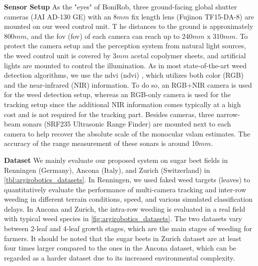 \noindent \textbf{Sensor Setup} 
As the "eyes" of BoniRob, three ground-facing global shutter cameras (JAI AD-130 GE) with an 8$mm$ fix length lens (Fujinon TF15-DA-8) are mounted on our weed control unit. T
he distances to the ground is approximately 800$mm$, and the \acrlong{fov} (\acrshort{fov}) of each camera can reach up to 240${mm}$ x 310${mm}$. 
To protect the camera setup and the perception system from natural light sources, the weed control unit is covered by 3$mm$ acetal copolymer sheets, and artificial lights are mounted to control the illumination. 
As in most state-of-the-art weed detection algorithms, we use the \acrlong{ndvi} (\acrshort{ndvi}) \cite{lottes2016effective}, which utilizes both color (RGB) and the near-infrared (NIR) information. 
To do so, an RGB+NIR camera is used for the weed detection setup, whereas an RGB-only camera is used for the tracking setup since the additional NIR information comes typically at a high cost and is not required for the tracking part. 
Besides cameras, three narrow-beam sonars (SRF235 Ultrasonic Range Finder) are mounted next to each camera to help recover the absolute scale of the monocular \acrshort{vslam} estimates. 
The accuracy of the range measurement of these sonars is around 10$mm$.

\noindent \textbf{Dataset} We mainly evaluate our proposed system on sugar beet fields in Renningen (Germany), Ancona (Italy), and Zurich (Switzerland) in \ref{tbl:argirobotics_datasets}. In Renningen, we used faked weed targets (leaves) to quantitatively evaluate the performance of multi-camera tracking and inter-row weeding in different terrain conditions, speed, and various simulated classification delays. In Ancona and Zurich, the intra-row weeding is evaluated in a real field with typical weed species in \ref{fig:argirobotics_datasets}. The two datasets vary between 2-leaf and 4-leaf growth stages, which are the main stages of weeding for farmers. It should be noted that the sugar beets in Zurich dataset are at least four times larger compared to the ones in the Ancona dataset, which can be regarded as a harder dataset due to its increased environmental complexity.

